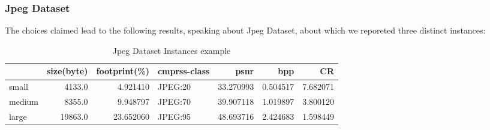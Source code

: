 



\begin{frame}
\frametitle{Jpeg Dataset}
The choices claimed lead to the following results, speaking about Jpeg Dataset, about which we reporeted three distinct instances:

\begin{table}
\begin{tabular}{lrrlrrr}
\hline
 &  size(byte) &  footprint(\%) & cmprss-class &       psnr &       bpp &        CR \\
\hline
\hline
small  &      4133.0 &      4.921410 &      JPEG:20 &  33.270993 &  0.504517 &  7.682071 \\
medium &      8355.0 &      9.948797 &      JPEG:70 &  39.907118 &  1.019897 &  3.800120 \\
large  &     19863.0 &     23.652060 &      JPEG:95 &  48.693716 &  2.424683 &  1.598449 \\
\hline
\end{tabular}
\caption{Jpeg Dataset Instances example}
\end{table}



\end{frame}